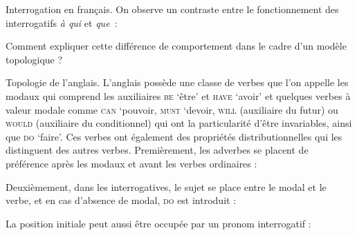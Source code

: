 {     Interrogation en français. On observe un contraste entre le fonctionnement des interrogatifs \textit{à qui} et \textit{que~}:
    
    \begin{exe}
    \begin{xlista}
    \end{xlista}
    \end{exe}
    Comment expliquer cette différence de comportement dans le cadre d’un modèle topologique ?

     Topologie de l’anglais. L’anglais possède une classe de verbes que l’on appelle les modaux qui comprend les auxiliaires \textsc{be} ‘être’ et \textsc{have} ‘avoir’ et quelques verbes à valeur modale comme \textsc{can} ‘pouvoir, \textsc{must} ‘devoir, \textsc{will} (auxiliaire du futur) ou \textsc{would} (auxiliaire du conditionnel) qui ont la particularité d’être invariables, ainsi que \textsc{do} ‘faire’. Ces verbes ont également des propriétés distributionnelles qui les distinguent des autres verbes. Premièrement, les adverbes se placent de préférence après les modaux et avant les verbes ordinaires :
    
    \begin{exe}
    \begin{xlista}
    \end{xlista}
    \end{exe}

    Deuxièmement, dans les interrogatives, le sujet se place entre le modal et le verbe, et en cas d’absence de modal, \textsc{do} est introduit :
    
    \begin{exe}
    \begin{xlista}
    \end{xlista}
    \end{exe}
    La position initiale peut aussi être occupée par un pronom interrogatif :
    
}
